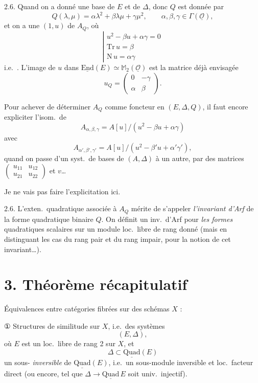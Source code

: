 \documentclass[11pt,a4paper]{article}
\begin{document}
2.6. Quand on a donné une base de $E$ et de $\Delta$, donc $Q$ est donnée par
\[
  Q(\lambda, \mu) = \alpha \lambda^{2} + \beta \lambda \mu + \gamma \mu^{2}, \qquad \alpha, \beta, \gamma \in \Gamma(\underline{\mathcal{O}}),
\]
et on  a une  $(1, u)$ de $A_Q$, où
\[
  \left|\begin{array}{l}
    u^{2} - \beta u + \alpha\gamma = 0 \\
    \mathrm{Tr}\, u = \beta \\
    \mathrm{N}\, u = \alpha\gamma
  \end{array}\right.
\]
i.e.\ . L'image de $u$ dans $\underline{\mathrm{End}}(E) \simeq \mathbb{M}_2(\underline{\mathcal{O}})$ est la matrice déjà envisagée
\[
  u_Q = \begin{pmatrix} 0 & -\gamma \\ \alpha & \beta \end{pmatrix} .
\]

Pour achever de déterminer $A_Q$ comme foncteur en $(E, \Delta, Q)$, il faut encore expliciter l'isom.\ de
\[
  A_{\alpha, \beta, \gamma} = A[u]/(u^{2} - \beta u + \alpha\gamma)
\]
avec
\[
  A_{\alpha', \beta', \gamma'} = A[u]/(u^{2} - \beta' u + \alpha'\gamma'),
\]
quand on passe d'un syst.\ de bases de $(A, \Delta)$ à un autre, par des matrices $\begin{pmatrix} u_{11} & u_{12} \\ u_{21} & u_{22} \end{pmatrix}$ et $v$…

Je ne vais pas faire l'explicitation ici.

2.6. L'exten.\ quadratique  associée à $A_Q$ mérite de s'appeler \emph{l'invariant d'Arf} de la forme quadratique binaire $Q$. On définit un inv.\ d'Arf pour \emph{les formes} quadratiques scalaires sur un module loc.\ libre de rang donné (mais en distinguant les cas du rang pair et du rang impair, pour la notion de cet invariant…).

\section*{3. Théorème récapitulatif}

Équivalences entre \struck{\ill{}} catégories fibrées sur   des schémas $X$ :

① Structures de similitude   sur $X$, i.e.\ des systèmes
\[
  (E, \Delta),
\]
où $E$ est un  loc.\ libre de rang 2 sur $X$, et
\[
  \Delta \subset \underline{\mathrm{Quad}}(E)
\]
un sous-   \struck{\ill{}} \emph{inversible} de $\underline{\mathrm{Quad}}(E)$, i.e.\ un sous-module inversible et loc.\ facteur direct (ou encore, tel que $\Delta \to \underline{\mathrm{Quad}}\, E$ soit univ.\ injectif).
\end{document}
